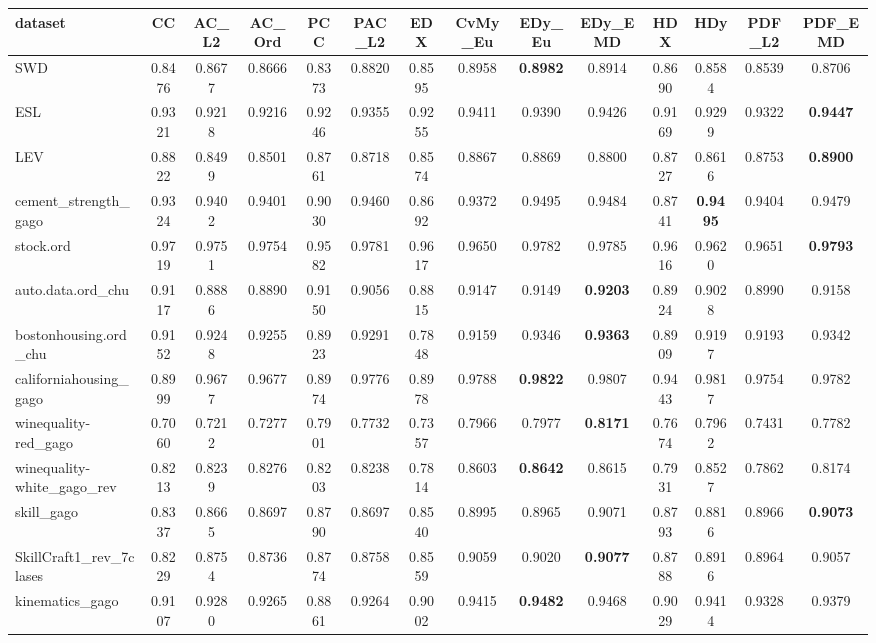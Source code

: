 \begin{tabular}{lccccccccccccc}
\toprule
dataset & CC & AC_L2 & AC_Ord & PCC & PAC_L2 & EDX & CvMy_Eu & EDy_Eu & EDy_EMD & HDX & HDy & PDF_L2 & PDF_EMD \\
\midrule
SWD & 0.8476 & 0.8677 & 0.8666 & 0.8373 & 0.8820 & 0.8595 & 0.8958 & \textbf{0.8982} & 0.8914 & 0.8690 & 0.8584 & 0.8539 & 0.8706 \\
ESL & 0.9321 & 0.9218 & 0.9216 & 0.9246 & 0.9355 & 0.9255 & 0.9411 & 0.9390 & 0.9426 & 0.9169 & 0.9299 & 0.9322 & \textbf{0.9447} \\
LEV & 0.8822 & 0.8499 & 0.8501 & 0.8761 & 0.8718 & 0.8574 & 0.8867 & 0.8869 & 0.8800 & 0.8727 & 0.8616 & 0.8753 & \textbf{0.8900} \\
cement_strength_gago & 0.9324 & 0.9402 & 0.9401 & 0.9030 & 0.9460 & 0.8692 & 0.9372 & 0.9495 & 0.9484 & 0.8741 & \textbf{0.9495} & 0.9404 & 0.9479 \\
stock.ord & 0.9719 & 0.9751 & 0.9754 & 0.9582 & 0.9781 & 0.9617 & 0.9650 & 0.9782 & 0.9785 & 0.9616 & 0.9620 & 0.9651 & \textbf{0.9793} \\
auto.data.ord_chu & 0.9117 & 0.8886 & 0.8890 & 0.9150 & 0.9056 & 0.8815 & 0.9147 & 0.9149 & \textbf{0.9203} & 0.8924 & 0.9028 & 0.8990 & 0.9158 \\
bostonhousing.ord_chu & 0.9152 & 0.9248 & 0.9255 & 0.8923 & 0.9291 & 0.7848 & 0.9159 & 0.9346 & \textbf{0.9363} & 0.8909 & 0.9197 & 0.9193 & 0.9342 \\
californiahousing_gago & 0.8999 & 0.9677 & 0.9677 & 0.8974 & 0.9776 & 0.8978 & 0.9788 & \textbf{0.9822} & 0.9807 & 0.9443 & 0.9817 & 0.9754 & 0.9782 \\
winequality-red_gago & 0.7060 & 0.7212 & 0.7277 & 0.7901 & 0.7732 & 0.7357 & 0.7966 & 0.7977 & \textbf{0.8171} & 0.7674 & 0.7962 & 0.7431 & 0.7782 \\
winequality-white_gago_rev & 0.8213 & 0.8239 & 0.8276 & 0.8203 & 0.8238 & 0.7814 & 0.8603 & \textbf{0.8642} & 0.8615 & 0.7931 & 0.8527 & 0.7862 & 0.8174 \\
skill_gago & 0.8337 & 0.8665 & 0.8697 & 0.8790 & 0.8697 & 0.8540 & 0.8995 & 0.8965 & 0.9071 & 0.8793 & 0.8816 & 0.8966 & \textbf{0.9073} \\
SkillCraft1_rev_7clases & 0.8229 & 0.8754 & 0.8736 & 0.8774 & 0.8758 & 0.8559 & 0.9059 & 0.9020 & \textbf{0.9077} & 0.8788 & 0.8916 & 0.8964 & 0.9057 \\
kinematics_gago & 0.9107 & 0.9280 & 0.9265 & 0.8861 & 0.9264 & 0.9002 & 0.9415 & \textbf{0.9482} & 0.9468 & 0.9029 & 0.9414 & 0.9328 & 0.9379 \\

\end{tabular}
